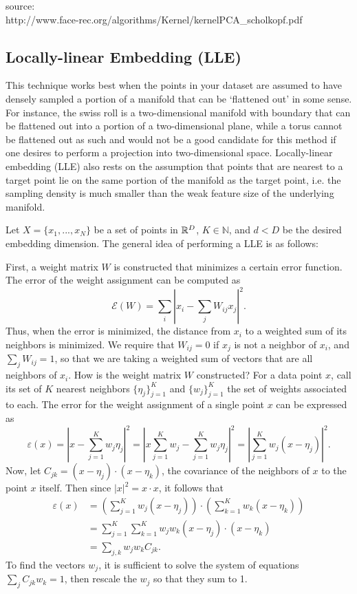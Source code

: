 \documentclass{gtpart}
\theoremstyle{definition}
\begin{document}
source:\\
http://www.face-rec.org/algorithms/Kernel/kernelPCA\_scholkopf.pdf


\subsection{Locally-linear Embedding (LLE)}

This technique works best when the points in your dataset are assumed to have densely sampled a portion of a manifold that can be `flattened out' in some sense. For instance, the swiss roll is a two-dimensional manifold with boundary that can be flattened out into a portion of a two-dimensional plane, while a torus cannot be flattened out as such and would not be a good candidate for this method if one desires to perform a projection into two-dimensional space. Locally-linear embedding (LLE) also rests on the assumption that points that are nearest to a target point lie on the same portion of the manifold as the target point, i.e. the sampling density is much smaller than the weak feature size of the underlying manifold. 

Let $X = \{x_1, ..., x_N\}$ be a set of points in $\mathbb{R}^D$, $K \in \mathbb{N}$, and $d < D$ be the desired embedding dimension. The general idea of performing a LLE is as follows:

First, a weight matrix $W$ is constructed that minimizes a certain error function. The error of the weight assignment can be computed as $$\mathscr{E}(W) = \sum_i \left| x_i - \sum_j W_{ij} x_j \right|^2.$$ Thus, when the error is minimized, the distance from $x_i$ to a weighted sum of its neighbors is minimized. We require that $W_{ij} = 0$ if $x_j$ is not a neighbor of $x_i$, and $\sum_j W_{ij} = 1$, so that we are taking a weighted sum of vectors that are all neighbors of $x_i$. How is the weight matrix $W$ constructed? For a data point $x$, call its set of $K$ nearest neighbors $\{ \eta_j\}_{j=1}^K$ and $\{w_j\}_{j=1}^K$ the set of weights associated to each. The error for the weight assignment of a single point $x$ can be expressed as $$\varepsilon(x) = \left| x - \sum_{j=1}^K w_j \eta_j \right|^2 = \left| x\sum_{j=1}^K w_j - \sum_{j=1}^K w_j \eta_j \right|^2 = \left| \sum_{j=1}^K w_j(x - \eta_j)\right|^2.$$ Now, let $C_{jk} = (x - \eta_j) \cdot (x - \eta_k)$, the covariance of the neighbors of $x$ to the point $x$ itself. Then since $|x|^2 =  x \cdot x $, it follows that 
\begin{align*}
\varepsilon(x) &= \left (  \sum_{j=1}^K w_j(x - \eta_j) \right) \cdot \left( \sum_{k=1}^K w_k(x - \eta_k) \right ) \\
&= \sum_{j=1}^K \sum_{k=1}^K w_j w_k  (x - \eta_j) \cdot (x - \eta_k) \\
&= \sum_{j,k} w_j w_k C_{jk}.
\end{align*}
To find the vectors $w_j$, it is sufficient to solve the system of equations $\sum_j C_{jk}w_k = 1$, then rescale the $w_j$ so that they sum to 1. 
\end{document}
